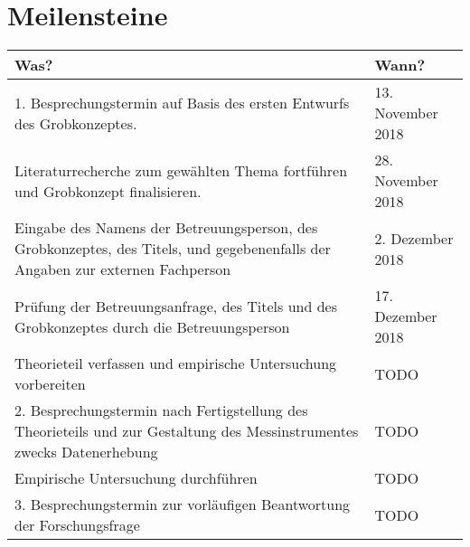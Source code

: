\documentclass[12pt, twoside, table]{extarticle}
\begin{document}
\newpage
\section{Meilensteine}



 
\begin{center}
    \renewcommand{\arraystretch}{1.5}
    \setlength{\tabcolsep}{15pt}
    \begin{tabular}{ | p{8cm} | l |}
    \hline
    \rowcolor{ccc} Was? & Wann? \\ \hline
    1. Besprechungstermin auf Basis des ersten Entwurfs des Grobkonzeptes. & 13. November 2018 \\ \hline
    
    Literaturrecherche zum gewählten Thema fortführen und Grobkonzept finalisieren. & 28. November 2018 \\ \hline
    
    \rowcolor{orange} Eingabe des Namens der Betreuungsperson, des Grobkonzeptes, des Titels, und gegebenenfalls der Angaben zur externen Fachperson & 2. Dezember 2018 \\ \hline
    
    Prüfung der Betreuungsanfrage, des Titels und des Grobkonzeptes durch die Betreuungsperson & 17. Dezember 2018 \\ \hline
    
    Theorieteil verfassen und empirische Untersuchung vorbereiten & TODO \\ \hline
    
    2. Besprechungstermin nach Fertigstellung des Theorieteils und zur Gestaltung des Messinstrumentes zwecks Datenerhebung & TODO \\ \hline
    
    Empirische Untersuchung durchführen & TODO \\ \hline
    
    3. Besprechungstermin zur vorläufigen Beantwortung der Forschungsfrage & TODO \\ \hline
    

\end{tabular}
\end{center}
\end{document}
